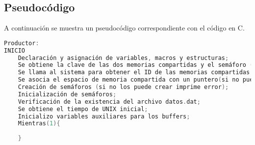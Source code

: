 \subsection{Pseudocódigo}

A continuación se muestra un pseudocódigo correspondiente con el código en C.\\

\begin{lstlisting}[language=C]
Productor:
INICIO
    Declaración y asignación de variables, macros y estructuras;
    Se obtiene la clave de las dos memorias compartidas y el semáforo (en el caso de que no las obtenga imprime error);
    Se llama al sistema para obtener el ID de las memorias compartidas (en el caso de que no las obtenga imprime error);
    Se asocia el espacio de memoria compartida con un puntero(si no puede asociar imprime error);
    Creación de semáforos (si no los puede crear imprime error);
    Inicialización de semáforos;
    Verificación de la existencia del archivo datos.dat;
    Se obtiene el tiempo de UNIX inicial;
    Inicializo variables auxiliares para los buffers;
    Mientras(1){
	
    }


\end{lstlisting}
